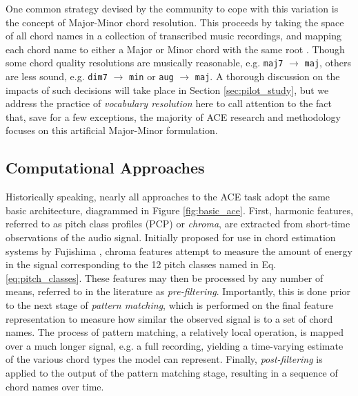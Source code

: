 One common strategy devised by the community to cope with this variation is the concept of Major-Minor chord resolution.
This proceeds by taking the space of all chord names in a collection of transcribed music recordings, and mapping each chord name to either a Major or Minor chord with the same root \cite{McVicar2013}.
Though some chord quality resolutions are musically reasonable, e.g. \texttt{maj7} $\to$ \texttt{maj}, others are less sound, e.g. \texttt{dim7} $\to$ \texttt{min} or \texttt{aug} $\to$ \texttt{maj}.
A thorough discussion on the impacts of such decisions will take place in Section \ref{sec:pilot_study}, but we address the practice of \emph{vocabulary resolution} here to call attention to the fact that, save for a few exceptions, the majority of ACE research and methodology focuses on this artificial Major-Minor formulation.


\subsection{Computational Approaches}
\label{subsec:computational_approaches}

Historically speaking, nearly all approaches to the ACE task adopt the same basic architecture, diagrammed in Figure \ref{fig:basic_ace}.
First, harmonic features, referred to as pitch class profiles (PCP) or \emph{chroma}, are extracted from short-time observations of the audio signal.
Initially proposed for use in chord estimation systems by Fujishima \cite{fujishima1999}, chroma features attempt to measure the amount of energy in the signal corresponding to the 12 pitch classes named in Eq. \ref{eq:pitch_classes}.
These features may then be processed by any number of means, referred to in the literature as \emph{pre-filtering}.
Importantly, this is done prior to the next stage of \emph{pattern matching}, which is performed on the final feature representation to measure how similar the observed signal is to a set of chord names.
The process of pattern matching, a relatively local operation, is mapped over a much longer signal, e.g. a full recording, yielding a time-varying estimate of the various chord types the model can represent.
Finally, \emph{post-filtering} is applied to the output of the pattern matching stage, resulting in a sequence of chord names over time.

